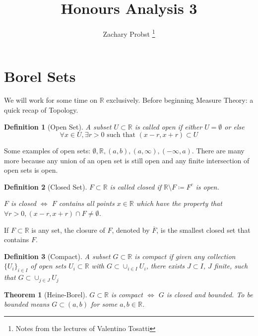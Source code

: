 \documentclass[11pt]{article}
\title{Honours Analysis 3}
\author{Zachary Probst \thanks{Notes from the lectures of Valentino Tosatti}}
\newtheorem{theorem}{Theorem}[section]
\newtheorem{definition}{Definition}[section]
\begin{document}
    \maketitle

    \section{Borel Sets}\label{sec:borel-sets}

    We will work for some time on $\mathbb{R}$ exclusively.
    Before beginning Measure Theory: a quick recap of Topology.

    \begin{definition}[Open Set]
        A subset $U \subset \mathbb{R}$ is called \emph{open} if either $U = \emptyset$ or else
        \[
            \forall x \in U, \exists r > 0 \text{ such that } (x-r,x+r) \subset U
        \]
    \end{definition}

    Some examples of open sets: $\emptyset, \mathbb{R}, (a,b), (a,\infty), (-\infty, a)$.
    There are many more because any union of an open set is still open and any finite intersection of open sets is open.

    \begin{definition}[Closed Set]
        $F \subset \mathbb{R}$ is called \emph{closed} if $\mathbb{R} \setminus F \coloneqq F^c $ is open.

        $F$ is closed $\iff$ $F$ contains all points $x \in \mathbb{R}$ which have the property that $\forall r > 0, (x-r, x+r) \cap F \neq \emptyset$.
    \end{definition}

    If $F \subset \mathbb{R}$ is any set, the closure of $F$, denoted by $\overline{F}$, is the smallest closed set that contains $F$.

    \begin{definition}[Compact]
        A subset $G \subset \mathbb{R}$ is \emph{compact} if given any collection $\{ U_i \}_{i \in I}$ of open sets $U_i \subset \mathbb{R}$ with $G \subset \cup_{i \in I} U_i$, there exists $J \subset I$, $J$ finite, such that $G \subset \cup_{j \in J} U_j$
    \end{definition}

    \begin{theorem}[Heine-Borel]
        $G \subset \mathbb{R}$ is compact $\iff$ $G$ is closed and bounded.
        To be bounded means $G \subset (a,b)$ for some $a,b \in \mathbb{R}$.
    \end{theorem}
\end{document}
